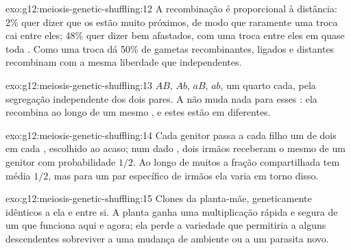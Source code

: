 \begin{solution}{exo:g12:meiosis-genetic-shuffling:12}
A recombinação é proporcional à distância: 2\% quer dizer que os 
estão muito próximos, de modo que raramente uma troca cai entre eles;
48\% quer dizer bem afastados, com uma troca entre eles em quase toda
. Como uma troca dá 50\% de gametas recombinantes,  ligados
e distantes recombinam com a mesma liberdade que  independentes.
\end{solution}

\begin{solution}{exo:g12:meiosis-genetic-shuffling:13}
$AB$, $Ab$, $aB$, $ab$, um quarto cada, pela segregação independente
dos dois pares. A  não muda nada para esses : ela
recombina  ao longo de um mesmo , e estes estão em
 diferentes.
\end{solution}

\begin{solution}{exo:g12:meiosis-genetic-shuffling:14}
Cada genitor passa a cada filho um de dois  em cada ,
escolhido ao acaso; num dado , dois irmãos receberam o mesmo 
de um genitor com probabilidade $1/2$. Ao longo de muitos  a
fração compartilhada tem média $1/2$, mas para um par específico de
irmãos ela varia em torno disso.
\end{solution}

\begin{solution}{exo:g12:meiosis-genetic-shuffling:15}
Clones da planta-mãe, geneticamente idênticos a ela e entre si. A
planta ganha uma multiplicação rápida e segura de um  que
funciona aqui e agora; ela perde a variedade que permitiria a alguns
descendentes sobreviver a uma mudança de ambiente ou a um parasita novo.
\end{solution}

